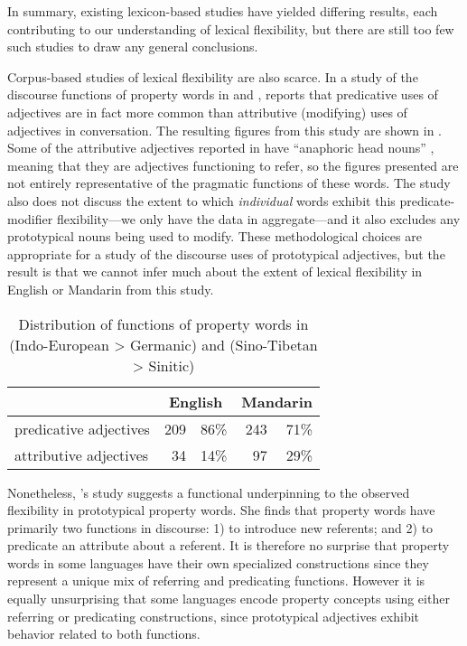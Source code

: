 In summary, existing lexicon-based studies have yielded differing results, each contributing to our understanding of lexical flexibility, but there are still too few such studies to draw any general conclusions.

Corpus-based studies of lexical flexibility are also scarce. In a study of the discourse functions of property words in  and , \textcite{Thompson1989} reports that predicative uses of adjectives are in fact more common than attributive (modifying) uses of adjectives in conversation. The resulting figures from this study are shown in . Some of the attributive adjectives reported in  have \enquote{anaphoric head nouns} \parencite[258]{Thompson1989}, meaning that they are adjectives functioning to refer, so the figures presented are not entirely representative of the pragmatic functions of these words. The study also does not discuss the extent to which \emph{individual} words exhibit this predicate-modifier flexibility—we only have the data in aggregate—and it also excludes any prototypical nouns being used to modify. These methodological choices are appropriate for a study of the discourse uses of prototypical adjectives, but the result is that we cannot infer much about the extent of lexical flexibility in English or Mandarin from this study.

\begin{table}[h]
  \centering
  \caption[Distribution of functions of property words in English (Indo-European > Germanic) and Mandarin (Sino-Tibetan > Sinitic)]{Distribution of functions of property words in  (Indo-European > Germanic) and  (Sino-Tibetan > Sinitic) \parencite[253, 257]{Thompson1989}}
  \label{tab:Thompson-1989}
  \begin{tabular}{ l r r r r }
    \toprule
      {                    } & \multicolumn{2}{c}{English} & \multicolumn{2}{c}{Mandarin} \\
    \midrule
      predicative adjectives & 209 & 86\%                  & 243 & 71\% \\
      attributive adjectives &  34 & 14\%                  &  97 & 29\% \\
    \bottomrule
  \end{tabular}
\end{table}

Nonetheless, \citeauthor{Thompson1989}'s study suggests a functional underpinning to the observed flexibility in prototypical property words. She finds that property words have primarily two functions in discourse: 1) to introduce new referents; and 2) to predicate an attribute about a referent. It is therefore no surprise that property words in some languages have their own specialized constructions since they represent a unique mix of referring and predicating functions. However it is equally unsurprising that some languages encode property concepts using either referring or predicating constructions, since prototypical adjectives exhibit behavior related to both functions.

